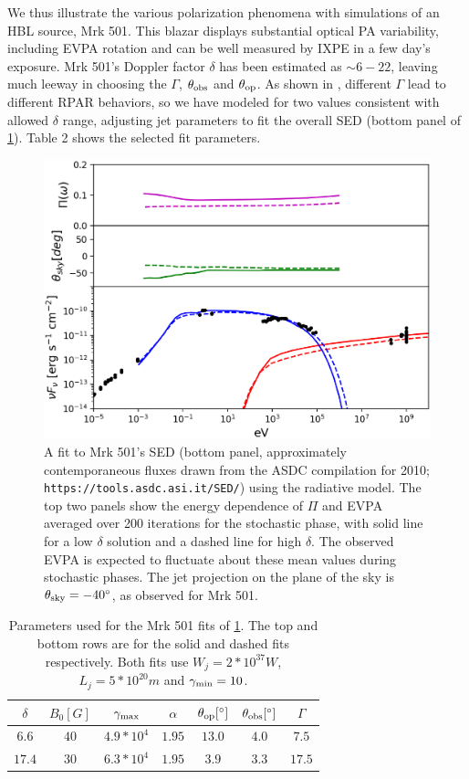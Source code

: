     We thus illustrate the various polarization phenomena with simulations of an HBL source,  Mrk 501. This blazar displays substantial optical PA variability, including EVPA rotation and can be well measured by IXPE in a few day's exposure. Mrk 501's Doppler factor $\delta$ has been estimated as $\sim 6-22$, leaving much leeway in choosing the $\Gamma$, $\theta_{\rm obs}$ and $\theta_{\rm op}$. As shown in , different $\Gamma$ lead to different RPAR behaviors, so we have modeled for two values consistent with allowed $\delta$ range, adjusting jet parameters to fit the overall SED (bottom panel of \cref{fig:f11}). Table 2 shows the selected fit parameters. 

\begin{figure}[t]
\label{fig:f11}
\includegraphics[width=0.8\linewidth]{figures/f11.eps}
\centering
\caption{A fit to Mrk 501's SED (bottom panel, approximately contemporaneous fluxes drawn from the ASDC compilation for 2010; {\tt https://tools.asdc.asi.it/SED/}) using the radiative model. The top two panels show the energy dependence of $\Pi$ and EVPA averaged over 200 iterations for the stochastic phase, with solid line for a low $\delta$ solution and a dashed line for high $\delta$. The observed EVPA is expected to fluctuate about these mean values during stochastic phases. The jet projection on the plane of the sky is $\theta_{\rm sky} =-40^{\circ}$, as observed for Mrk 501.}
\end{figure}
\begin{table}[h!]
\centering
\begin{tabular}{c c c c c c c} 
\toprule
$\delta$ & $B_0[G]$ & $\gamma_{\rm max}$ & $\alpha$ & $\theta_{\rm op}[^{\circ}]$ & $\theta_{\rm obs}[^{\circ}]$ & $\Gamma$ \\ 
\midrule
$6.6$ & $40$ & $4.9*10^{4}$ & $1.95$ & $13.0$ & $4.0$ & $7.5$ \\ 
$17.4$ & $30$ & $6.3*10^{4}$ & $1.95$ & $3.9$ & $3.3$ & $17.5$ \\ 
 \bottomrule
\end{tabular}
\caption{Parameters used for the Mrk 501 fits of \cref{fig:f11}. The top and bottom rows are for the solid and dashed fits respectively. Both fits use $W_j = 2*10^{37}W$, $L_j = 5*10^{20}m$ and $\gamma_{\rm min}=10$.}
\end{table}

